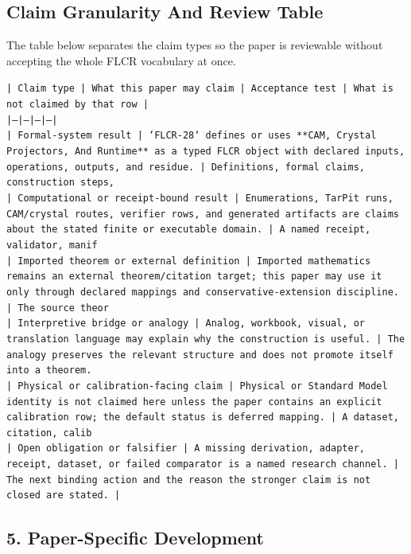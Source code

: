\documentclass[11pt]{article}
\begin{document}
\subsection*{Claim Granularity And Review Table}

The table below separates the claim types so the paper is reviewable without accepting the whole FLCR vocabulary at once.

\noindent\texttt{| Claim type | What this paper may claim | Acceptance test | What is not claimed by that row |}\\
\noindent\texttt{|---|---|---|---|}\\
\noindent\texttt{| Formal-system result | `FLCR-28` defines or uses **CAM, Crystal Projectors, And Runtime** as a typed FLCR object with declared inputs, operations, outputs, and residue. | Definitions, formal claims, construction steps,}\\
\noindent\texttt{| Computational or receipt-bound result | Enumerations, TarPit runs, CAM/crystal routes, verifier rows, and generated artifacts are claims about the stated finite or executable domain. | A named receipt, validator, manif}\\
\noindent\texttt{| Imported theorem or external definition | Imported mathematics remains an external theorem/citation target; this paper may use it only through declared mappings and conservative-extension discipline. | The source theor}\\
\noindent\texttt{| Interpretive bridge or analogy | Analog, workbook, visual, or translation language may explain why the construction is useful. | The analogy preserves the relevant structure and does not promote itself into a theorem. }\\
\noindent\texttt{| Physical or calibration-facing claim | Physical or Standard Model identity is not claimed here unless the paper contains an explicit calibration row; the default status is deferred mapping. | A dataset, citation, calib}\\
\noindent\texttt{| Open obligation or falsifier | A missing derivation, adapter, receipt, dataset, or failed comparator is a named research channel. | The next binding action and the reason the stronger claim is not closed are stated. | }\\

\subsection*{5. Paper-Specific Development}
\end{document}
